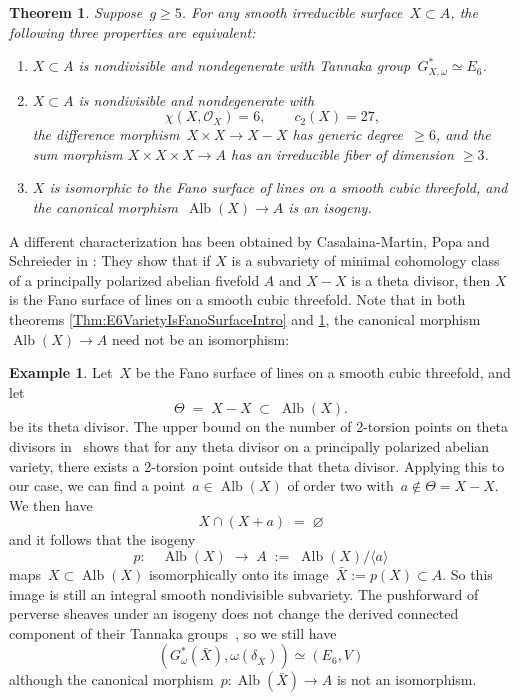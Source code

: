 \documentclass[a4paper]{amsart}
\newcommand{\cO}{\mathcal{O}}
\DeclareMathOperator{\Alb}{Alb}
\renewcommand{\ge}{\geqslant}
\theoremstyle{plain}
\newtheorem{theoremintro}{Theorem}
\theoremstyle{definition}
\newtheorem*{exampleintro}{Example}
\numberwithin{equation}{section}
\begin{document}
\begin{theoremintro} \label{Thm:E6SurfaceIsFanoSurfaceIntro} Suppose~$g \ge 5$. For any smooth irreducible surface~$X \subset A$, the following three properties are equivalent:\smallskip
\begin{enumerate}
\item $X\subset A$ is nondivisible and nondegenerate with Tannaka group~$G_{X,\omega}^\ast \simeq E_6$.\smallskip
\item $X\subset A$ is nondivisible and nondegenerate with 
\[ \chi(X, \cO_X)=6,
 \qquad c_2(X)= 27,
\]
the difference morphism~$ X\times X \to X-X$ has generic degree~$\ge 6$, and the sum morphism $X \times X \times X \to A$ has an irreducible fiber of dimension $\ge 3$.
\smallskip
\item $X$ is isomorphic to the Fano surface of lines on a smooth cubic threefold, and the canonical morphism~$\Alb(X) \to A$ is an isogeny. \smallskip
\end{enumerate}
\end{theoremintro}

A different characterization has been obtained by Casalaina-Martin, Popa and Schreieder in \cite[th. 6.1]{CasalainaPopaSchreieder}: They show that if $X$ is a subvariety of minimal cohomology class of a principally polarized abelian fivefold $A$ and $X - X$ is a theta divisor, then $X$ is the Fano surface of lines on a smooth cubic threefold. Note that in both theorems \ref{Thm:E6VarietyIsFanoSurfaceIntro} and \ref{Thm:E6SurfaceIsFanoSurfaceIntro}, the canonical morphism~$\Alb(X) \to A$ need not be an isomorphism: 

\begin{exampleintro} \label{ex:TheFanoSurfaceAsAnE6}
Let~$X$ be the Fano surface of lines on a smooth cubic threefold, and let
%
\[
 \Theta \;=\; X - X \;\subset\; \Alb(X).
\]
%
be its theta divisor. The upper bound on the number of 2-torsion points on theta divisors in~\cite{MarcucciPirola}
shows that for any theta divisor on a principally polarized abelian variety, there exists a 2-torsion point outside that theta divisor. Applying this to our case, we can find a point~$a\in \Alb(X)$ of order two with~$a \notin \Theta = X-X$. We then have
%
\[
 X \cap (X+a) \;=\; \varnothing
\]
%
and it follows that the isogeny 
%
\[
 p\colon \quad \Alb(X) \;\longrightarrow\; A \;:=\; \Alb(X)/\langle a \rangle
\]
%
maps~$X\subset \Alb(X)$ isomorphically onto its image~$\bar{X} := p(X) \subset A$. So this image is still an integral smooth nondivisible subvariety. The pushforward of perverse sheaves under an isogeny does not change the derived connected component of their Tannaka groups~\cite[cor. 3.5]{JKLM}, so we still have 
%
\[ (G_\omega^\ast(\bar{X}), \omega(\delta_{\bar{X}})) \simeq (E_6, V)
\]
%
although the canonical morphism~$p\colon \Alb(\bar{X}) \to A$ is not an isomorphism.
\end{exampleintro}
\end{document}
